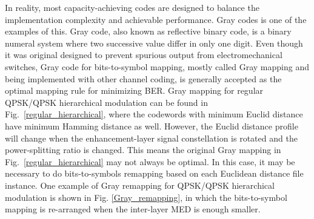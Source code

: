\documentclass[10pt,fleqn, twocolumn]{IEEEtran}
\begin{document}
In reality, most capacity-achieving codes are designed to balance
the implementation complexity and achievable performance. Gray
codes is one of the examples of this. Gray code, also known as
reflective binary code, is a binary numeral system where two
successive value differ in only one digit. Even though it was
original designed to prevent spurious output from
electromechanical switches, Gray code for bits-to-symbol mapping,
mostly called Gray mapping and being implemented with other
channel coding, is generally accepted as the optimal mapping rule
for minimizing BER. Gray mapping for regular QPSK/QPSK
hierarchical modulation can be found in
Fig.~\ref{regular_hierarchical}, where the codewords with minimum
Euclid distance have minimum Hamming distance as well. However,
the Euclid distance profile will change when the enhancement-layer
signal constellation is rotated and the power-splitting ratio is
changed. This means the original Gray mapping in
Fig.~\ref{regular_hierarchical} may not always be optimal. In this
case, it may be necessary to do bits-to-symbols remapping based on
each Euclidean distance file instance. One example of Gray
remapping for QPSK/QPSK hierarchical modulation is shown in Fig.
\ref{Gray_remapping}, in which the bits-to-symbol mapping is
re-arranged when the inter-layer MED is enough smaller.
\begin{figure}
\end{figure}
\end{document}
